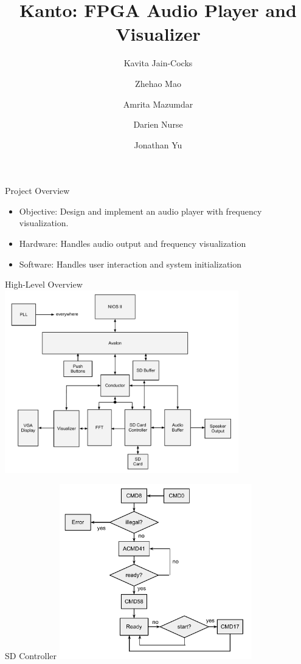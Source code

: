 \documentclass{beamer}
\title{Kanto: FPGA Audio Player and Visualizer}
\author{
  Kavita Jain-Cocks
  \and
  Zhehao Mao
  \and
  Amrita Mazumdar
  \and
  Darien Nurse
  \and
  Jonathan Yu}
\begin{document}
\begin{frame}
	\titlepage
\end{frame}

\begin{frame}{Project Overview}
	\begin{itemize}
		\item Objective: Design and implement an audio player with frequency visualization.
		\item Hardware: Handles audio output and frequency visualization
		\item Software: Handles user interaction and system initialization
	\end{itemize}
\end{frame}

\begin{frame}{High-Level Overview}
	\centering
	\includegraphics[width=4in]{top_level}
\end{frame}

\begin{frame}{SD Controller}
	\centering
	\includegraphics[height=3in]{sd-controller}
\end{frame}
\end{document}
